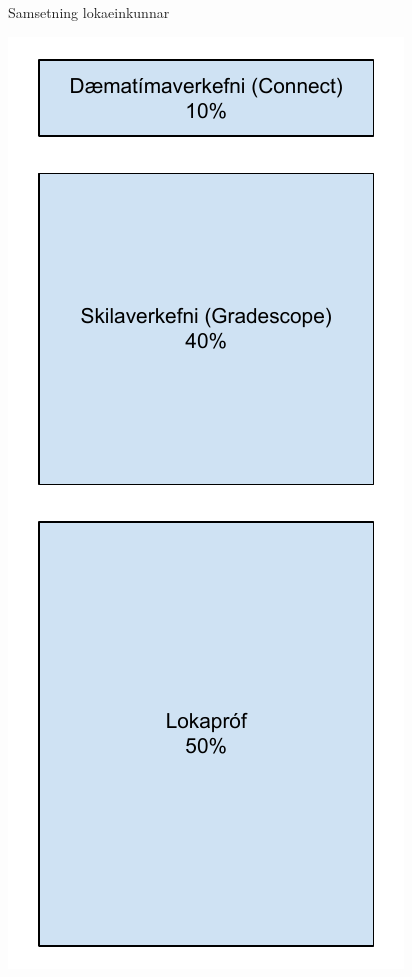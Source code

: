 \documentclass[justified, nobib]{tufte-handout}
\begin{document}
\begin{marginfigure}
\caption{Samsetning lokaeinkunnar}
\includegraphics[width=\linewidth]{Pics/namsmat}
\end{marginfigure}
\end{document}
